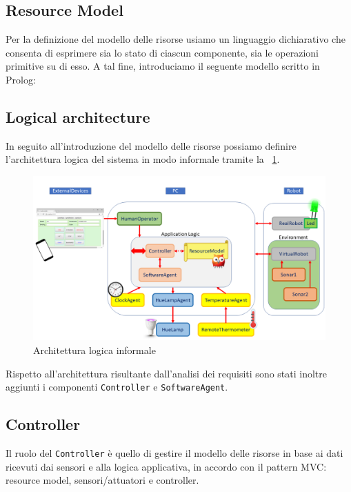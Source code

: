 \documentclass{../llncs}
\newcommand{\labelfig}[1]{\label{fig:#1}}
\newcommand{\xf}[1]{\figurename~\ref{fig:#1}}
\begin{document}
\subsection{Resource Model}
Per la definizione del modello delle risorse usiamo un linguaggio dichiarativo che consenta di esprimere sia lo stato di ciascun componente, sia le operazioni primitive su di esso. A tal fine, introduciamo il seguente modello scritto in Prolog:\\



\subsection{Logical architecture}
In seguito all'introduzione del modello delle risorse possiamo definire l'architettura logica del sistema in modo informale tramite la \xf{informalLA}.

\begin{figure}[!htb]
\centering
\includegraphics[scale=0.4]{img/informalArchitecture2.png}
\caption{Architettura logica informale}\labelfig{informalLA}
\end{figure}

Rispetto all'architettura risultante dall'analisi dei requisiti sono stati inoltre aggiunti i componenti \texttt{Controller} e \texttt{SoftwareAgent}.

\subsection{Controller}
Il ruolo del \texttt{Controller} è quello di gestire il modello delle risorse in base ai dati ricevuti dai sensori e alla logica applicativa, in accordo con il pattern MVC: resource model, sensori/attuatori e controller.
\end{document}
